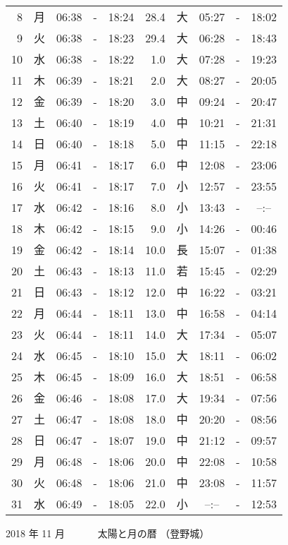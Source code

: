 \documentclass[a4j,10pt]{jsarticle}
\begin{document}
\begin{center}
\begin{table}[ht]
\begin{center}
\begin{tabular}{|rc|ccc|rc|ccc|}
  8 & 月 & 06:38 &-& 18:24 & 28.4 & 大 & 05:27 &-& 18:02 \\
  9 & 火 & 06:38 &-& 18:23 & 29.4 & 大 & 06:28 &-& 18:43 \\
 10 & 水 & 06:38 &-& 18:22 &  1.0 & 大 & 07:28 &-& 19:23 \\
 11 & 木 & 06:39 &-& 18:21 &  2.0 & 大 & 08:27 &-& 20:05 \\
 12 & 金 & 06:39 &-& 18:20 &  3.0 & 中 & 09:24 &-& 20:47 \\
 13 & 土 & 06:40 &-& 18:19 &  4.0 & 中 & 10:21 &-& 21:31 \\
 14 & 日 & 06:40 &-& 18:18 &  5.0 & 中 & 11:15 &-& 22:18 \\
 15 & 月 & 06:41 &-& 18:17 &  6.0 & 中 & 12:08 &-& 23:06 \\
 16 & 火 & 06:41 &-& 18:17 &  7.0 & 小 & 12:57 &-& 23:55 \\
 17 & 水 & 06:42 &-& 18:16 &  8.0 & 小 & 13:43 &-& --:-- \\
 18 & 木 & 06:42 &-& 18:15 &  9.0 & 小 & 14:26 &-& 00:46 \\
 19 & 金 & 06:42 &-& 18:14 & 10.0 & 長 & 15:07 &-& 01:38 \\
 20 & 土 & 06:43 &-& 18:13 & 11.0 & 若 & 15:45 &-& 02:29 \\
 21 & 日 & 06:43 &-& 18:12 & 12.0 & 中 & 16:22 &-& 03:21 \\
 22 & 月 & 06:44 &-& 18:11 & 13.0 & 中 & 16:58 &-& 04:14 \\
 23 & 火 & 06:44 &-& 18:11 & 14.0 & 大 & 17:34 &-& 05:07 \\
 24 & 水 & 06:45 &-& 18:10 & 15.0 & 大 & 18:11 &-& 06:02 \\
 25 & 木 & 06:45 &-& 18:09 & 16.0 & 大 & 18:51 &-& 06:58 \\
 26 & 金 & 06:46 &-& 18:08 & 17.0 & 大 & 19:34 &-& 07:56 \\
 27 & 土 & 06:47 &-& 18:08 & 18.0 & 中 & 20:20 &-& 08:56 \\
 28 & 日 & 06:47 &-& 18:07 & 19.0 & 中 & 21:12 &-& 09:57 \\
 29 & 月 & 06:48 &-& 18:06 & 20.0 & 中 & 22:08 &-& 10:58 \\
 30 & 火 & 06:48 &-& 18:06 & 21.0 & 中 & 23:08 &-& 11:57 \\
 31 & 水 & 06:49 &-& 18:05 & 22.0 & 小 & --:-- &-& 12:53 \\
\hline
\end{tabular}
\end{center}
\end{table}
\newpage
{\large 2018 年 11 月}
{\Large 　　　太陽と月の暦   （登野城） }

\end{center}
\end{document}
